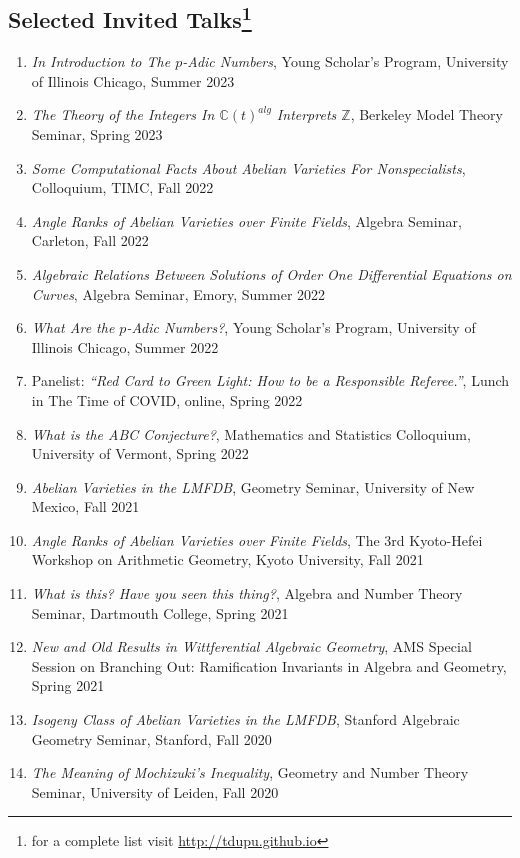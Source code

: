 \documentclass[a4paper,10pt]{article}
\begin{document}
\subsection*{Selected Invited Talks\footnote{ for a complete list visit \url{http://tdupu.github.io} }} 
\begin{enumerate} %
	\item \emph{In Introduction to The $p$-Adic Numbers}, Young Scholar’s Program, University of Illinois Chicago, Summer 2023
	\item \emph{The Theory of the Integers In $\mathbb{C}(t)^{alg}$ Interprets $\mathbb{Z}$}, Berkeley Model Theory Seminar, Spring 2023
	\item \emph{Some Computational Facts About Abelian Varieties For Nonspecialists}, Colloquium, TIMC, Fall 2022
	\item \emph{Angle Ranks of Abelian Varieties over Finite Fields}, Algebra Seminar, Carleton, Fall 2022
	\item \emph{Algebraic Relations Between Solutions of Order One Differential Equations on Curves}, Algebra Seminar, Emory, Summer 2022
	\item \emph{What Are the $p$-Adic Numbers?}, Young Scholar’s Program, University of Illinois Chicago, Summer 2022
	\item Panelist: \emph{“Red Card to Green Light: How to be a Responsible Referee.”}, Lunch in The Time of COVID, online, Spring 2022
	\item \emph{What is the ABC Conjecture?}, Mathematics and Statistics Colloquium, University of Vermont, Spring 2022
	\item \emph{Abelian Varieties in the LMFDB}, Geometry Seminar, University of New Mexico, Fall 2021
	\item \emph{Angle Ranks of Abelian Varieties over Finite Fields}, The 3rd Kyoto-Hefei Workshop on Arithmetic Geometry, Kyoto University, Fall 2021
	\item \emph{What is this? Have you seen this thing?}, Algebra and Number Theory Seminar, Dartmouth College, Spring 2021
	\item \emph{New and Old Results in Wittferential Algebraic Geometry}, AMS Special Session on Branching Out: Ramification Invariants in Algebra and Geometry, Spring 2021
	\item \emph{Isogeny Class of Abelian Varieties in the LMFDB}, Stanford Algebraic Geometry Seminar, Stanford, Fall 2020
	\item \emph{The Meaning of Mochizuki’s Inequality}, Geometry and Number Theory Seminar, University of Leiden, Fall 2020

\end{enumerate}
\end{document}
